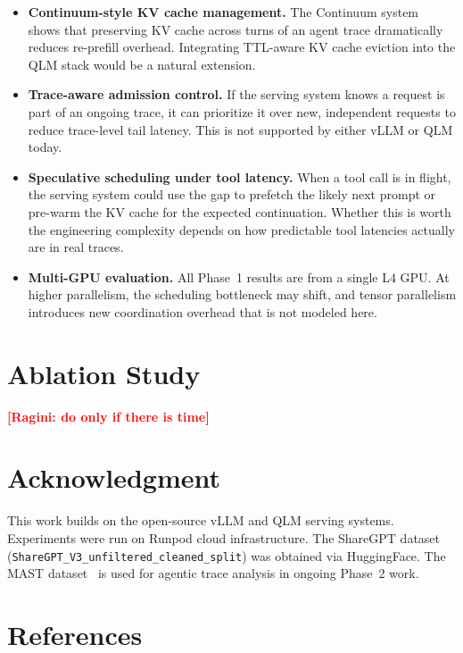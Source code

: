 \documentclass[10pt, twocolumn, letterpaper]{article}
\newcommand{\ragini}[1]{\textcolor{red}{\textbf{[Ragini: #1]}}}
\begin{document}
\begin{itemize}
    \item \textbf{Continuum-style KV cache management.} The Continuum system~\cite{continuum} shows that preserving KV cache across turns of an agent trace dramatically reduces re-prefill overhead. Integrating TTL-aware KV cache eviction into the QLM stack would be a natural extension.
    \item \textbf{Trace-aware admission control.} If the serving system knows a request is part of an ongoing trace, it can prioritize it over new, independent requests to reduce trace-level tail latency. This is not supported by either vLLM or QLM today.
    \item \textbf{Speculative scheduling under tool latency.} When a tool call is in flight, the serving system could use the gap to prefetch the likely next prompt or pre-warm the KV cache for the expected continuation. Whether this is worth the engineering complexity depends on how predictable tool latencies actually are in real traces.
    \item \textbf{Multi-GPU evaluation.} All Phase~1 results are from a single L4 GPU. At higher parallelism, the scheduling bottleneck may shift, and tensor parallelism introduces new coordination overhead that is not modeled here.
\end{itemize}

\section{Ablation Study} \ragini{do only if there is time}

\section*{Acknowledgment}
This work builds on the open-source vLLM and QLM serving systems. Experiments were run on Runpod cloud infrastructure. The ShareGPT dataset (\texttt{ShareGPT\_V3\_unfiltered\_cleaned\_split}) was obtained via HuggingFace. The MAST dataset~\cite{mast} is used for agentic trace analysis in ongoing Phase~2 work.

\section*{References}
\end{document}
